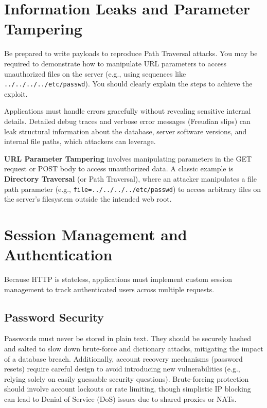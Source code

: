 \section{Information Leaks and Parameter Tampering}
\begin{tcolorbox}[colback=blue!5!white,colframe=blue!75!black,title=Exam Insight]
Be prepared to write payloads to reproduce Path Traversal attacks. You may be required to demonstrate how to manipulate URL parameters to access unauthorized files on the server (e.g., using sequences like \texttt{../../../../etc/passwd}). You should clearly explain the steps to achieve the exploit.
\end{tcolorbox}
Applications must handle errors gracefully without revealing sensitive internal details. Detailed debug traces and verbose error messages (Freudian slips) can leak structural information about the database, server software versions, and internal file paths, which attackers can leverage.

\textbf{URL Parameter Tampering} involves manipulating parameters in the GET request or POST body to access unauthorized data. A classic example is \textbf{Directory Traversal} (or Path Traversal), where an attacker manipulates a file path parameter (e.g., \texttt{file=../../../../etc/passwd}) to access arbitrary files on the server's filesystem outside the intended web root.

\section{Session Management and Authentication}
Because HTTP is stateless, applications must implement custom session management to track authenticated users across multiple requests.

\subsection{Password Security}
Passwords must never be stored in plain text. They should be securely hashed and salted to slow down brute-force and dictionary attacks, mitigating the impact of a database breach. Additionally, account recovery mechanisms (password resets) require careful design to avoid introducing new vulnerabilities (e.g., relying solely on easily guessable security questions). Brute-forcing protection should involve account lockouts or rate limiting, though simplistic IP blocking can lead to Denial of Service (DoS) issues due to shared proxies or NATs.

